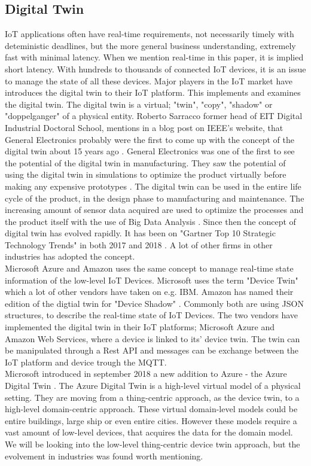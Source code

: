 \subsection{Digital Twin}
IoT applications often have real-time requirements, not necessarily timely with deteministic deadlines, but the more general business understanding, extremely fast with minimal latency. When we mention real-time in this paper, it is implied short latency. With hundreds to thousands of connected IoT devices, it is an issue to manage the state of all these devices. Major players in the IoT market have introduces the digital twin to their IoT platform. This implements and examines the digital twin. The digital twin is a virtual; "twin", "copy", "shadow" or "doppelganger" of a physical entity. Roberto Sarracco former head of EIT Digital Industrial Doctoral School, mentions in a blog post on IEEE's website, that General Electronics probably were the first to come up with the concept of the digital twin about 15 years ago \cite{IEEE}.
General Electronics was one of the first to see the potential of the digital twin in manufacturing. They saw the potential of using the digital twin in simulations to optimize the product virtually before making any expensive prototypes \cite{GE}. The digital twin can be used in the entire life cycle of the product, in the design phase to manufacturing and maintenance. The increasing amount of sensor data acquired are used to optimize the processes and the product itself with the use of Big Data Analysis \cite{8477101}. Since then the concept of digital twin has evolved rapidly. It has been on "Gartner Top 10 Strategic Technology Trends" in both 2017 and 2018 \cite{Gartner}. A lot of other firms in other industries has adopted the concept. \\

Microsoft Azure and Amazon uses the same concept to manage real-time state information of the low-level IoT Devices. Microsoft uses the term "Device Twin" \cite{MS} which a lot of other vendors have taken on e.g. IBM. Amazon has named their edition of the digtial twin for "Device Shadow" \cite{Amazon}. Commonly both are using JSON structures, to describe the real-time state of IoT Devices. The two vendors have implemented the digital twin in their IoT platforms; Microsoft Azure and Amazon Web Services, where a device is linked to its' device twin. The twin can be manipulated through a Rest API and messages can be exchange between the IoT platform and device trough the MQTT. \\

Microsoft introduced in september 2018 a new addition to Azure - the Azure Digital Twin \cite{azuredigitaltwin}. The Azure Digital Twin is a high-level virtual model of a physical setting. They are moving from a thing-centric approach, as the device twin, to a high-level domain-centric approach. These virtual domain-level models could be entire buildings, large ship or even entire cities. However these models require a vast amount of low-level devices, that acquires the data for the domain model. We will be looking into the low-level thing-centric device twin approach, but the evolvement in industries was found worth mentioning. 